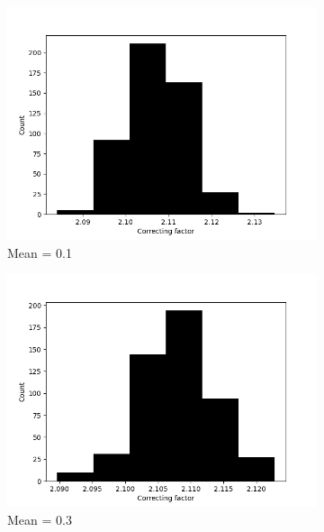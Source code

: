    \begin{figure}
      \begin{subfigure}[t]{0.45\textwidth}
        \centering
        \includegraphics[width=1\textwidth]{./images/robust_approx/results_2d_high_rank_figures/correcting_factors_hadamard_mean_10_01.png}
        \caption{Mean = 0.1}
      \end{subfigure}
      \begin{subfigure}[t]{0.45\textwidth}
        \centering
        \includegraphics[width=1\textwidth]{./images/robust_approx/results_2d_high_rank_figures/correcting_factors_hadamard_mean_10_03.png}
        \caption{Mean = 0.3}
      \end{subfigure}
      \begin{subfigure}[t]{0.45\textwidth}

\end{subfigure}
\end{figure}
